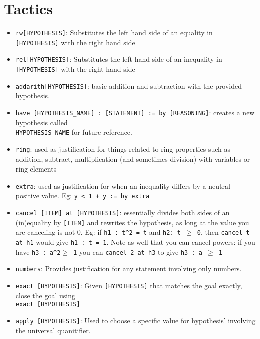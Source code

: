 \documentclass{exam}
\begin{document}
    \pagestyle{headandfoot}
    \runningheadrule
    \firstpageheadrule
    \runningfooter{}{\thepage}{}
    \firstpagefooter{}{}{}

    \section*{Tactics}
    \begin{itemize}
        \item \verb|rw[HYPOTHESIS]|: Substitutes the left hand side of an equality in \texttt{[HYPOTHESIS]} with the right hand side
        \item \verb|rel[HYPOTHESIS]|: Substitutes the left hand side of an inequality in \texttt{[HYPOTHESIS]} with the right hand side
        \item \verb|addarith[HYPOTHESIS]|: basic addition and subtraction with the provided hypothesis. 
        \item \verb|have [HYPOTHESIS_NAME] : [STATEMENT] := by [REASONING]|: creates a new hypothesis called \\ \verb|HYPOTHESIS_NAME| for future reference. 
        \item \verb|ring|: used as justification for things related to ring properties such as addition, subtract, multiplication (and sometimes division) with variables or ring elements
        \item \verb|extra|: used as justification for when an inequality differs by a neutral positive value. Eg: \texttt{y < 1 + y := by extra}
        \item \verb|cancel [ITEM] at [HYPOTHESIS]|: essentially divides both sides of an (in)equality by \verb|[ITEM]| and rewrites the hypothesis, as long at the value you are canceling is not 0. Eg: if \texttt{h1 : t\^{}2 = t} and \texttt{h2: t $\geq$ 0}, then \texttt{cancel t at h1} would give \texttt{h1 : t = 1}. Note as well that you can cancel powers: if you have \texttt{h3 : a\^{}2$\geq$ 1} you can \texttt{cancel 2 at h3} to give \texttt{h3 : a $\geq$ 1}
        \item \verb|numbers|: Provides justification for any statement involving only numbers.
        \item \verb|exact [HYPOTHESIS]|: Given \texttt{[HYPOTHESIS]} that matches the goal exactly, close the goal using \\ \verb|exact [HYPOTHESIS]|
        \item \verb|apply [HYPOTHESIS]|: Used to choose a specific value for hypothesis' involving the universal quanitifier.
    \end{itemize}
\end{document}
